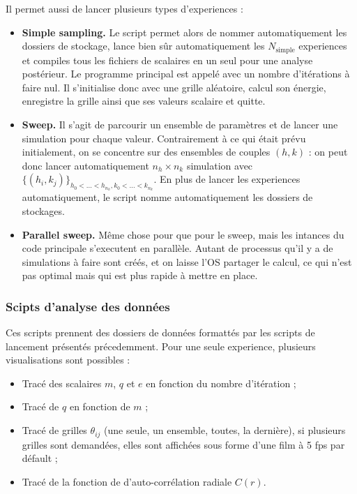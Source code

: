 \documentclass[a4paper, openany, 11pt]{article}
\begin{document}
Il permet aussi de lancer plusieurs types d'experiences :
\begin{itemize}
    \item \textbf{Simple sampling.} Le script permet alors de nommer automatiquement les dossiers de
        stockage, lance bien sûr automatiquement les $N_\text{simple}$ experiences et compiles tous
        les fichiers de scalaires en un seul pour une analyse postérieur. Le programme principal est
        appelé avec un nombre d'itérations à faire nul. Il s'initialise donc avec une grille
        aléatoire, calcul son énergie, enregistre la grille ainsi que ses valeurs scalaire et
        quitte.
    \item \textbf{Sweep.} Il s'agit de parcourir un ensemble de paramètres et de lancer une
        simulation pour chaque valeur. Contrairement à ce qui était prévu initialement, on se
        concentre sur des ensembles de couples $(h, k)$ : on peut donc lancer automatiquement 
        $n_h\times n_k$ simulation avec $\{(h_i, k_j)\}_{h_0 < \hdots < h_{n_h}, k_0 < \hdots < k_{n_k}}$.
        En plus de lancer les experiences automatiquement, le script nomme automatiquement les
        dossiers de stockages. 
    \item \textbf{Parallel sweep.} Même chose pour que pour le sweep, mais les intances du code
        principale s'executent en parallèle. Autant de processus qu'il y a de simulations à faire
        sont créés, et on laisse l'OS partager le calcul, ce qui n'est pas optimal mais qui est plus
        rapide à mettre en place. 
\end{itemize}


\subsubsection{Scipts d'analyse des données}

Ces scripts prennent des dossiers de données formattés par les scripts de lancement présentés
précedemment. Pour une seule experience, plusieurs visualisations sont possibles :
\begin{itemize}
    \item Tracé des scalaires $m$, $q$ et $e$ en fonction du nombre d'itération ;
    \item Tracé de $q$ en fonction de $m$ ;
    \item Tracé de grilles $\theta_{ij}$ (une seule, un ensemble, toutes, la dernière), si
        plusieurs grilles sont demandées, elles sont affichées sous forme d'une film à 5 fps par
        défault ;
    \item Tracé de la fonction de d'auto-corrélation radiale $C(r)$.
\end{itemize}
\end{document}
